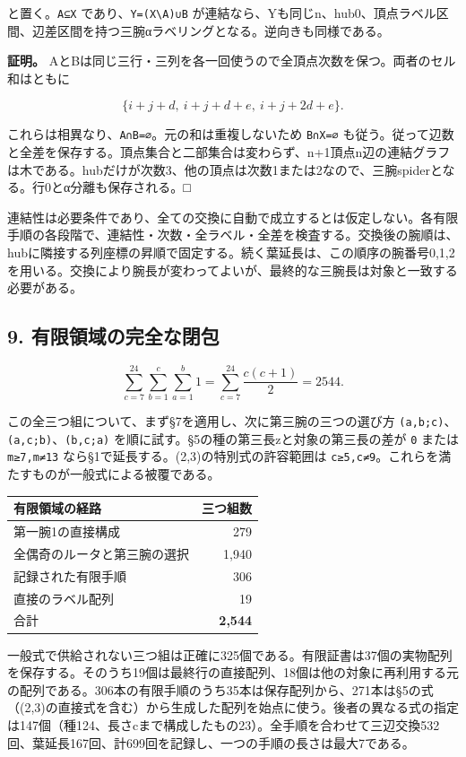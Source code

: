 \documentclass[
  10pt,
  a4paper,
]{article}
\let\originaltexttt\texttt
\renewcommand{\texttt}[1]{\leavevmode\allowbreak\mbox{\originaltexttt{#1}}}
\begin{document}
と置く。\texttt{A⊆X} であり、\texttt{Y=(X\textbackslash{}A)∪B}
が連結なら、Yも同じn、hub0、頂点ラベル区間、辺差区間を持つ三腕αラベリングとなる。逆向きも同様である。

\textbf{証明。}
AとBは同じ三行・三列を各一回使うので全頂点次数を保つ。両者のセル和はともに

\[
\{i+j+d,\ i+j+d+e,\ i+j+2d+e\}.
\]

これらは相異なり、\texttt{A∩B=∅}。元の和は重複しないため \texttt{B∩X=∅}
も従う。従って辺数と全差を保存する。頂点集合と二部集合は変わらず、n+1頂点n辺の連結グラフは木である。hubだけが次数3、他の頂点は次数1または2なので、三腕spiderとなる。行0とα分離も保存される。□

連結性は必要条件であり、全ての交換に自動で成立するとは仮定しない。各有限手順の各段階で、連結性・次数・全ラベル・全差を検査する。交換後の腕順は、hubに隣接する列座標の昇順で固定する。続く葉延長は、この順序の腕番号0,1,2を用いる。交換により腕長が変わってよいが、最終的な三腕長は対象と一致する必要がある。

\subsection{9.
有限領域の完全な閉包}\label{ux6709ux9650ux9818ux57dfux306eux5b8cux5168ux306aux9589ux5305}

\[
\sum_{c=7}^{24}\sum_{b=1}^{c}\sum_{a=1}^{b}1
=\sum_{c=7}^{24}\frac{c(c+1)}2=2544.
\]

この全三つ組について、まず§7を適用し、次に第三腕の三つの選び方
\texttt{(a,b;c)}、\texttt{(a,c;b)}、\texttt{(b,c;a)}
を順に試す。§5の種の第三長zと対象の第三長の差が \texttt{0} または
\texttt{m≥7,m≠13} なら§1で延長する。(2,3)の特別式の許容範囲は
\texttt{c≥5,c≠9}。これらを満たすものが一般式による被覆である。

\begin{center}
\begin{tabular}{@{}lr@{}}
\toprule\noalign{}
有限領域の経路 & 三つ組数 \\
\midrule\noalign{}
第一腕1の直接構成 & 279 \\
全偶奇のルータと第三腕の選択 & 1,940 \\
記録された有限手順 & 306 \\
直接のラベル配列 & 19 \\
合計 & \textbf{2,544} \\
\bottomrule
\end{tabular}
\end{center}

一般式で供給されない三つ組は正確に325個である。有限証書は37個の実物配列を保存する。そのうち19個は最終行の直接配列、18個は他の対象に再利用する元の配列である。306本の有限手順のうち35本は保存配列から、271本は§5の式（(2,3)の直接式を含む）から生成した配列を始点に使う。後者の異なる式の指定は147個（種124、長さcまで構成したもの23）。全手順を合わせて三辺交換532回、葉延長167回、計699回を記録し、一つの手順の長さは最大7である。
\end{document}
